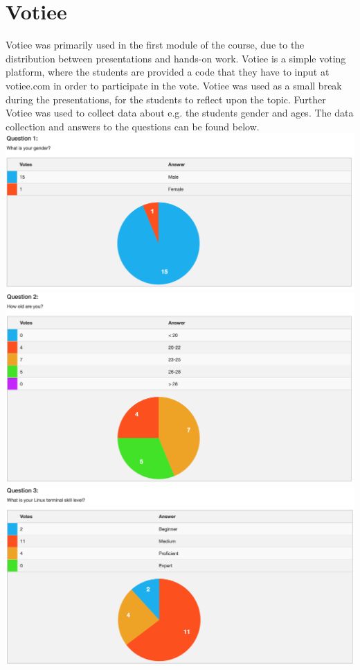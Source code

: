 
\section*{Votiee}
Votiee was primarily used in the first module of the course, due to the distribution between presentations and hands-on work. Votiee is a simple voting platform, where the students are provided a code that they have to input at votiee.com in order to participate in the vote. Votiee was used as a small break during the presentations, for the students to reflect upon the topic. Further Votiee was used to collect data about e.g. the students gender and ages. The data collection and answers to the questions can be found below. \\

\includegraphics[width=14cm]{figures/votiee/w1q1}\\
\includegraphics[width=14cm]{figures/votiee/w1q2}\\
\includegraphics[width=14cm]{figures/votiee/w1q3}\\
